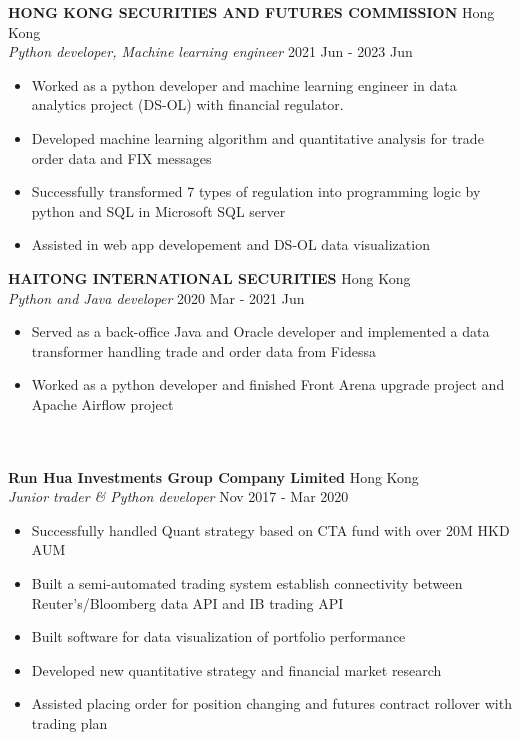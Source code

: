 \documentclass[a4paper]{article}
\newcommand{\lineunder} {
    \vspace*{-8pt} \\
    \hspace*{-18pt} \hrulefill \\
}
\begin{document}
\textbf{HONG KONG SECURITIES AND FUTURES COMMISSION} \hfill Hong Kong\\
\textit{Python developer, Machine learning engineer} \hfill 2021 Jun - 2023 Jun\\
\vspace{-1mm}
\begin{itemize} \itemsep 1pt
	\item Worked as a python developer and machine learning engineer in data analytics project (DS-OL) with financial regulator.
    \item Developed machine learning algorithm and quantitative analysis for trade order data and FIX messages
    \item Successfully transformed 7 types of regulation into programming logic by python and SQL in Microsoft SQL server
    \item Assisted in web app developement and DS-OL data visualization
\end{itemize}

\textbf{HAITONG INTERNATIONAL SECURITIES} \hfill Hong Kong\\
\textit{Python and Java developer} \hfill 2020 Mar - 2021 Jun\\
\vspace{-1mm}
\begin{itemize} \itemsep 1pt
	\item Served as a back-office Java and Oracle developer and implemented a data transformer handling trade and order data from Fidessa
	\item Worked as a python developer and finished Front Arena upgrade project and Apache Airflow project
\end{itemize}

\lineunder
\textbf{Run Hua Investments Group Company Limited} \hfill Hong Kong\\
\textit{Junior trader \& Python developer} \hfill Nov 2017 - Mar 2020\\
\vspace{-1mm}
\begin{itemize} \itemsep 1pt
	\item Successfully handled Quant strategy based on CTA fund with over 20M HKD AUM
	\item Built a semi-automated trading system establish connectivity between Reuter's/Bloomberg data API and IB trading API
	\item Built software for data visualization of portfolio performance
	\item Developed new quantitative strategy and financial market research
        \item Assisted placing order for position changing and futures contract rollover with trading plan
\end{itemize}
\end{document}
